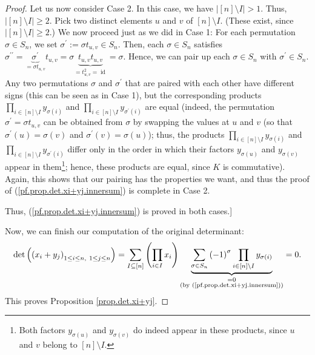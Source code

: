 \begin{proof}
Let us now consider Case 2. In this case, we have $\left\vert \left[
n\right]  \setminus I\right\vert >1$. Thus, $\left\vert \left[  n\right]
\setminus I\right\vert \geq2$. Pick two distinct elements $u$ and $v$ of
$\left[  n\right]  \setminus I$. (These exist, since $\left\vert \left[
n\right]  \setminus I\right\vert \geq2$.) We now proceed just as we did in
Case 1: For each permutation $\sigma\in S_{n}$, we set $\sigma^{\prime
}:=\sigma t_{u,v}\in S_{n}$. Then, each $\sigma\in S_{n}$ satisfies
$\sigma^{\prime\prime}=\underbrace{\sigma^{\prime}}_{=\sigma t_{u,v}}%
t_{u,v}=\sigma\underbrace{t_{u,v}t_{u,v}}_{=t_{u,v}^{2}=\operatorname*{id}%
}=\sigma$. Hence, we can pair up each $\sigma\in S_{n}$ with $\sigma^{\prime
}\in S_{n}$. Any two permutations $\sigma$ and $\sigma^{\prime}$ that are
paired with each other have different signs (this can be seen as in Case 1),
but the corresponding products $\prod\limits_{i\in\left[  n\right]  \setminus
I}y_{\sigma\left(  i\right)  }$ and $\prod\limits_{i\in\left[  n\right]
\setminus I}y_{\sigma^{\prime}\left(  i\right)  }$ are equal (indeed, the
permutation $\sigma^{\prime}=\sigma t_{u,v}$ can be obtained from $\sigma$ by
swapping the values at $u$ and $v$ (so that $\sigma^{\prime}\left(  u\right)
=\sigma\left(  v\right)  $ and $\sigma^{\prime}\left(  v\right)
=\sigma\left(  u\right)  $); thus, the products $\prod\limits_{i\in\left[
n\right]  \setminus I}y_{\sigma\left(  i\right)  }$ and $\prod\limits_{i\in
\left[  n\right]  \setminus I}y_{\sigma^{\prime}\left(  i\right)  }$ differ
only in the order in which their factors $y_{\sigma\left(  u\right)  }$ and
$y_{\sigma\left(  v\right)  }$ appear in them\footnote{Both factors
$y_{\sigma\left(  u\right)  }$ and $y_{\sigma\left(  v\right)  }$ do indeed
appear in these products, since $u$ and $v$ belong to $\left[  n\right]
\setminus I$.}; hence, these products are equal, since $K$ is commutative).
Again, this shows that our pairing has the properties we want, and thus the
proof of (\ref{pf.prop.det.xi+yj.innersum}) is complete in Case 2.

Thus, (\ref{pf.prop.det.xi+yj.innersum}) is proved in both cases.]

Now, we can finish our computation of the original determinant:%
\[
\det\left(  \left(  x_{i}+y_{j}\right)  _{1\leq i\leq n,\ 1\leq j\leq
n}\right)  =\sum\limits_{I\subseteq\left[  n\right]  }\left(  \prod
\limits_{i\in I}x_{i}\right)  \underbrace{\sum_{\sigma\in S_{n}}\left(
-1\right)  ^{\sigma}\prod\limits_{i\in\left[  n\right]  \setminus I}%
y_{\sigma\left(  i\right)  }}_{\substack{=0\\\text{(by
(\ref{pf.prop.det.xi+yj.innersum}))}}}=0.
\]
This proves Proposition \ref{prop.det.xi+yj}.
\end{proof}


